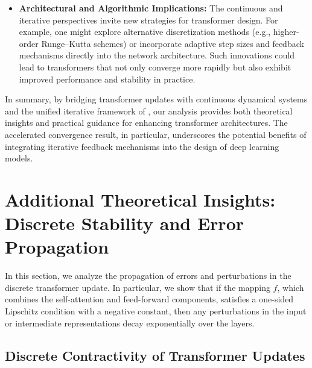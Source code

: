 \begin{itemize}[leftmargin=2em]
    \item \textbf{Architectural and Algorithmic Implications:} The continuous and iterative perspectives invite new strategies for transformer design. For example, one might explore alternative discretization methods (e.g., higher-order Runge–Kutta schemes) or incorporate adaptive step sizes and feedback mechanisms directly into the network architecture. Such innovations could lead to transformers that not only converge more rapidly but also exhibit improved performance and stability in practice.
\end{itemize}

In summary, by bridging transformer updates with continuous dynamical systems and the unified iterative framework of \cite{feinashley2025iterate}, our analysis provides both theoretical insights and practical guidance for enhancing transformer architectures. The accelerated convergence result, in particular, underscores the potential benefits of integrating iterative feedback mechanisms into the design of deep learning models.





\section{Additional Theoretical Insights: Discrete Stability and Error Propagation}

In this section, we analyze the propagation of errors and perturbations in the discrete transformer update. In particular, we show that if the mapping $f$, which combines the self-attention and feed-forward components, satisfies a one-sided Lipschitz condition with a negative constant, then any perturbations in the input or intermediate representations decay exponentially over the layers.

\subsection{Discrete Contractivity of Transformer Updates}

